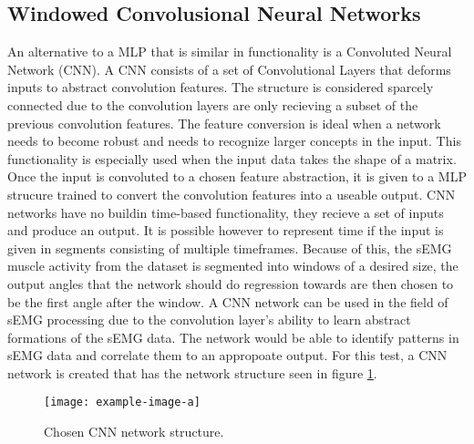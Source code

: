 \documentclass[../main.tex]{subfiles}
\begin{document}



\subsection{Windowed Convolusional Neural Networks}

An alternative to a MLP that is similar in functionality is a Convoluted Neural Network (CNN).
A CNN consists of a set of Convolutional Layers that deforms inputs to abstract convolution features.
The structure is considered sparcely connected due to the convolution layers are only recieving a subset of the previous convolution features.
The feature conversion is ideal when a network needs to become robust and needs to recognize larger concepts in the input.
This functionality is especially used when the input data takes the shape of a matrix.
Once the input is convoluted to a chosen feature abstraction, it is given to a MLP strucure trained to convert the convolution features into a useable output.
CNN networks have no buildin time-based functionality, they recieve a set of inputs and produce an output.
It is possible however to represent time if the input is given in segments consisting of multiple timeframes.
Because of this, the sEMG muscle activity from the dataset is segmented into windows of a desired size, the output angles that the network should do regression towards are then chosen to be the first angle after the window.
A CNN network can be used in the field of sEMG processing due to the convolution layer's ability to learn abstract formations of the sEMG data.
The network would be able to identify patterns in sEMG data and correlate them to an appropoate output.
For this test, a CNN network is created that has the network structure seen in figure \ref{fig:cnn_structure}.

\begin{figure}[h]
\begin{center}
\texttt{[image: example-image-a]}
\caption{Chosen CNN network structure.}
\label{fig:cnn_structure}
\end{center}
\end{figure}
\end{document}
